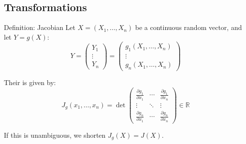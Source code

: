 \documentclass[a4paper]{article}
\begin{document}
\subsection{Transformations}
\begin{parag}{Definition: Jacobian}
    Let $X = \left(X_1, \ldots, X_n\right)$ be a continuous random vector, and let $Y = g\left(X\right)$: 
    \[Y = \begin{pmatrix} Y_1 \\ \vdots \\ Y_n \end{pmatrix} = \begin{pmatrix} g_1\left(X_1, \ldots, X_n\right) \\ \vdots \\ g_n\left(X_1, \ldots, X_n\right) \end{pmatrix} \]
    
    Their  is given by: 
    \[J_g\left(x_1, \ldots, x_n\right) = \det\begin{pmatrix} \frac{\partial g_1}{\partial x_1}  & \cdots & \frac{\partial g_1}{\partial x_n}  \\ \vdots & \ddots & \vdots \\ \frac{\partial g_n}{\partial x_1}  & \cdots & \frac{\partial g_n}{\partial x_n}  \end{pmatrix} \in \mathbb{R}\]

    If this is unambiguous, we shorten $J_g\left(X\right) = J\left(X\right)$.
\end{parag}
\end{document}
